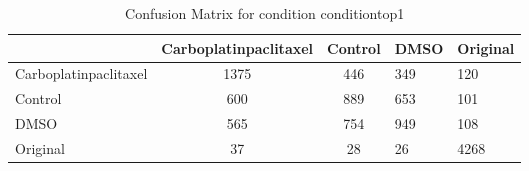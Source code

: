 \begin{table}[htbp]
\centering
\caption{Confusion Matrix for condition conditiontop1}
\label{tab:confusionmatrix.condition.conditiontop1}
\begin{tabular}{|l|cc|}
\toprule
 & Carboplatinpaclitaxel & Control & DMSO & Original \\
\midrule
Carboplatinpaclitaxel & 1375 & 446 & 349 & 120 \\
Control & 600 & 889 & 653 & 101 \\
DMSO & 565 & 754 & 949 & 108 \\
Original & 37 & 28 & 26 & 4268 \\
\bottomrule
\end{tabular}
\end{table}
